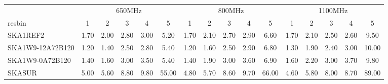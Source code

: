 \begin{table}[!htp]
{{\begin{tabular}{|lccccc||ccccc||ccccc|}
 \tabularnewline \cline{2-16} \multicolumn{1}{c}{ } & \multicolumn{5}{|c}{650MHz}  & \multicolumn{5}{c}{800MHz}  & \multicolumn{5}{c|}{1100MHz} \tabularnewline \cline{1-16} 
 resbin  &1 & 2 & 3 & 4 & 5 & 1 & 2 & 3 & 4 & 5 & 1 & 2 & 3 & 4 & 5 \tabularnewline \hline
SKA1REF2 & 1.70 \cellcolor{blue!23.53} & 2.00 \cellcolor{red!24.00} & 2.80 \cellcolor{green!20.00} & 3.00 \cellcolor{orange!19.20} & 5.20 \cellcolor{purple!18.00} & 1.70 \cellcolor{blue!23.83} & 2.10 \cellcolor{red!23.12} & 2.70 \cellcolor{green!19.38} & 2.90 \cellcolor{orange!18.00} & 6.60 \cellcolor{purple!18.00} & 1.70 \cellcolor{blue!23.09} & 2.10 \cellcolor{red!20.15} & 2.50 \cellcolor{green!18.75} & 2.60 \cellcolor{orange!18.00} & 9.50 \cellcolor{purple!18.00}\\ \hline 
SKA1W9-12A72B120 & 1.20 \cellcolor{blue!18.00} & 1.40 \cellcolor{red!18.00} & 2.50 \cellcolor{green!18.00} & 2.80 \cellcolor{orange!18.00} & 5.40 \cellcolor{purple!18.17} & 1.20 \cellcolor{blue!18.00} & 1.60 \cellcolor{red!18.00} & 2.50 \cellcolor{green!18.00} & 2.90 \cellcolor{orange!18.00} & 6.80 \cellcolor{purple!18.14} & 1.30 \cellcolor{blue!18.00} & 1.90 \cellcolor{red!18.00} & 2.40 \cellcolor{green!18.00} & 3.00 \cellcolor{orange!20.75} & 10.00 \cellcolor{purple!18.26}\\ \hline 
SKA1W9-0A72B120 & 1.40 \cellcolor{blue!20.21} & 1.60 \cellcolor{red!20.00} & 3.00 \cellcolor{green!21.33} & 3.50 \cellcolor{orange!22.20} & 5.40 \cellcolor{purple!18.17} & 1.40 \cellcolor{blue!20.33} & 1.90 \cellcolor{red!21.07} & 3.00 \cellcolor{green!21.44} & 3.60 \cellcolor{orange!22.32} & 6.90 \cellcolor{purple!18.21} & 1.60 \cellcolor{blue!21.82} & 2.20 \cellcolor{red!21.23} & 3.00 \cellcolor{green!22.50} & 3.70 \cellcolor{orange!25.57} & 9.80 \cellcolor{purple!18.16}\\ \hline 
SKASUR & 5.00 \cellcolor{blue!60.00} & 5.60 \cellcolor{red!60.00} & 8.80 \cellcolor{green!60.00} & 9.80 \cellcolor{orange!60.00} & 55.00 \cellcolor{purple!60.00} & 4.80 \cellcolor{blue!60.00} & 5.70 \cellcolor{red!60.00} & 8.60 \cellcolor{green!60.00} & 9.70 \cellcolor{orange!60.00} & 66.00 \cellcolor{purple!60.00} & 4.60 \cellcolor{blue!60.00} & 5.80 \cellcolor{red!60.00} & 8.00 \cellcolor{green!60.00} & 8.70 \cellcolor{orange!60.00} & 89.00 \cellcolor{purple!60.00}\tabularnewline \hline 
\end{tabular}}\hfil 
{}}
\end{table}
